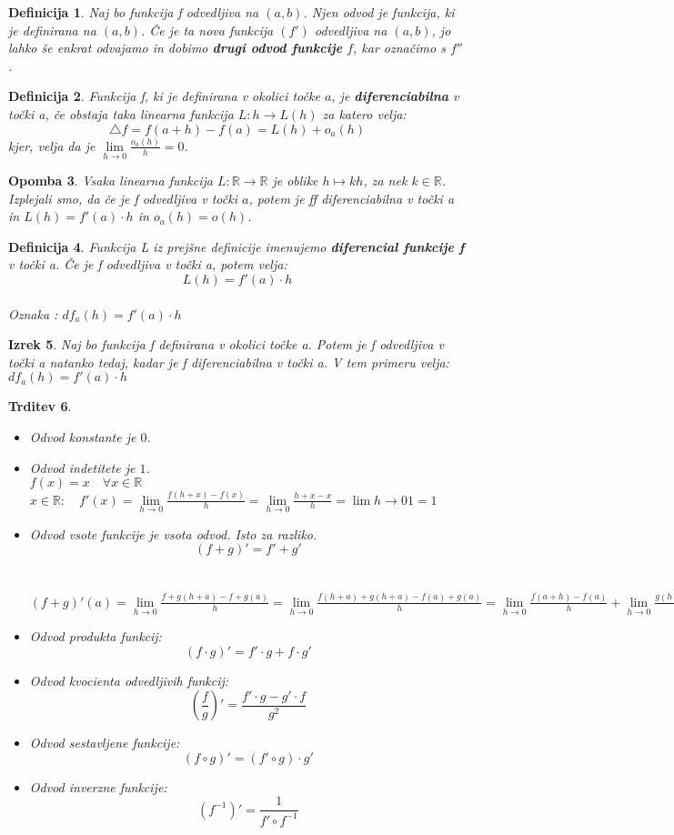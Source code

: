 \documentclass[11pt]{article}
\newtheorem{Izrek}{{\sc Izrek}}[section]
\newtheorem{Trditev}[Izrek]{{\sc Trditev}}
\newtheorem{Definicija}[Izrek]{{\sc Definicija}}
\newtheorem{Opomba}[Izrek]{{\sc Opomba}}
\begin{document}
\begin{Definicija}
	Naj bo funkcija f odvedljiva na $(a,b)$. Njen odvod je funkcija, ki je definirana na $(a,b)$. Če je ta nova funkcija $(f')$ odvedljiva na $(a,b)$, jo lahko še enkrat odvajamo in dobimo \textbf{drugi odvod funkcije} $f$, kar označimo s $f''$.
\end{Definicija}
\begin{Definicija}
	Funkcija f, ki je definirana v okolici točke $a$, je \textbf{diferenciabilna} v točki a, če obstaja taka linearna funkcija ${L} : h \to {L}(h)$ za katero velja:
	$$ \triangle f = f(a+h) - f(a) = L(h) + o_a(h)$$
	kjer, velja da je $\lim\limits_{h\to 0}{\frac{o_a(h)}{h}} = 0$.
\end{Definicija}
\begin{Opomba}
	Vsaka linearna funkcija $L: \mathbb{R} \to \mathbb{R}$ je oblike $ h\mapsto kh$, za nek $k\in \mathbb{R}$. Izplejali smo, da če je f odvedljiva v točki $a$, potem je ff diferenciabilna v točki a in $L(h) = f'(a) \cdot h$ in $o_a(h) = o(h)$.
\end{Opomba}
\begin{Definicija}
	Funkcija L iz prejšne definicije imenujemo \textbf{diferencial funkcije f} v točki a. Če je f odvedljiva v točki a, potem velja:
	$$ L(h) = f'(a) \cdot h$$
	\\
	Oznaka : $df_a(h) = f'(a) \cdot h $
\end{Definicija}
\begin{Izrek}
	Naj bo funkcija f definirana v okolici  točke a. Potem je f odvedljiva v točki a natanko tedaj, kadar je f diferenciabilna v točki a.
	V tem primeru velja: $ d f_a(h) = f'(a) \cdot h$
\end{Izrek}
\begin{Trditev}
	\begin{itemize}
		\item
			Odvod konstante je $0$.
		\item
			Odvod indetitete je $1$.
			\\
			$f(x) = x \quad \forall x\in \mathbb{R}$
			\\
			$x\in \mathbb{R}: \quad f'(x) = \lim\limits_{h \to 0}{\frac{f(h+x) - f(x)}{h}} = \lim\limits_{h\to 0}{\frac{h + x -x}{h}} = \lim\limits{h \to 0}{1} = 1$
		\item
			Odvod vsote funkcije je vsota odvod. Isto za razliko.
			$$(f+g)' = f' + g'$$
			\\
			\\
			$(f+g)'(a) = \lim\limits_{h \to 0}{\frac{f+g(h+a) - f+g(a)}{h}} = \lim\limits_{h \to 0}{\frac{f(h+a)+g(h+a) - f(a) + g(a)}{h}}  = \lim\limits_{h\to 0}{\frac{f(a+h)- f(a)}{h}} + \lim\limits_{h \to 0}{\frac{g(h+a) - g(a)}{h}} = f' + g'$
		\item
			Odvod produkta funkcij:
			$$(f\cdot g)' = f' \cdot g + f\cdot g' $$
		\item
			Odvod kvocienta odvedljivih funkcij:
			$$( \frac{f}{g})' = \frac{f' \cdot g - g' \cdot f}{g^2}$$
		\item
			Odvod sestavljene funkcije:
			$$(f\circ g)' = (f' \circ g)\cdot g'$$
		\item
			Odvod inverzne funkcije:
			$$(f^{-1})' = \frac{1}{f' \circ f^{-1}}$$
	\end{itemize}
\end{Trditev}
\end{document}
